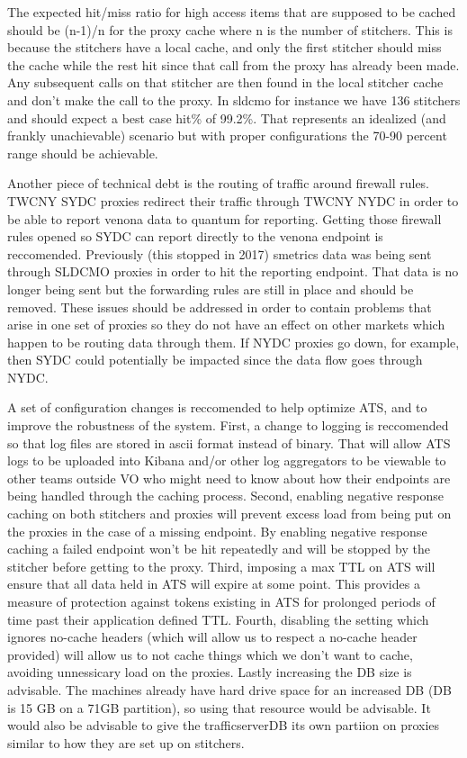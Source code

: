 \documentclass{article}
\begin{document}
The expected hit/miss ratio for high access items that are supposed to be cached should be (n-1)/n for the proxy cache where n is the number of stitchers. This is because the stitchers have a local cache, and only the first stitcher should miss the cache while the rest hit since that call from the proxy has already been made. Any subsequent calls on that stitcher are then found in the local stitcher cache and don't make the call to the proxy. In sldcmo for instance we have 136 stitchers and should expect a best case hit\% of 99.2\%. That represents an idealized (and frankly unachievable) scenario but with proper configurations the 70-90 percent range should be achievable.

Another piece of technical debt is the routing of traffic around firewall rules. TWCNY SYDC proxies redirect their traffic through TWCNY NYDC in order to be able to report venona data to quantum for reporting. Getting those firewall rules opened so SYDC can report directly to the venona endpoint is reccomended. Previously (this stopped in 2017) smetrics data was being sent through SLDCMO proxies in order to hit the reporting endpoint. That data is no longer being sent but the forwarding rules are still in place and should be removed. These issues should be addressed in order to contain problems that arise in one set of proxies so they do not have an effect on other markets which happen to be routing data through them. If NYDC proxies go down, for example, then SYDC could potentially be impacted since the data flow goes through NYDC.  

A set of configuration changes is reccomended to help optimize ATS, and to improve the robustness of the system. First, a change to logging is reccomended so that log files are stored in ascii format instead of binary. That will allow ATS logs to be uploaded into Kibana and/or other log aggregators to be viewable to other teams outside VO who might need to know about how their endpoints are being handled through the caching process. Second, enabling negative response caching on both stitchers and proxies will prevent excess load from being put on the proxies in the case of a missing endpoint. By enabling negative response caching a failed endpoint won't be hit repeatedly and will be stopped by the stitcher before getting to the proxy. Third, imposing a max TTL on ATS will ensure that all data held in ATS will expire at some point. This provides a measure of protection against tokens existing in ATS for prolonged periods of time past their application defined TTL. Fourth, disabling the setting which ignores no-cache headers (which will allow us to respect a no-cache header provided) will allow us to not cache things which we don't want to cache, avoiding unnessicary load on the proxies. Lastly increasing the DB size is advisable. The machines already have hard drive space for an increased DB (DB is 15 GB on a 71GB partition), so using that resource would be advisable. It would also be advisable to give the trafficserverDB its own partiion on proxies similar to how they are set up on stitchers. 
\end{document}
